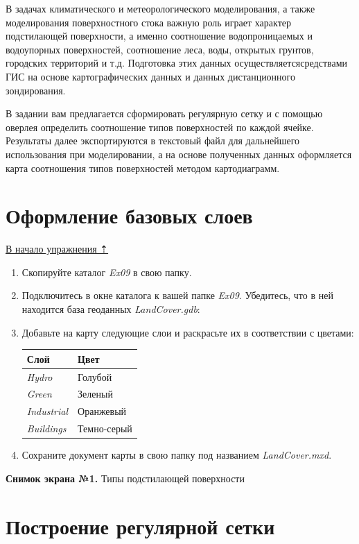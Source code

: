 \documentclass[]{book}
\theoremstyle{definition}
\theoremstyle{definition}
\theoremstyle{definition}
\theoremstyle{remark}
\begin{document}
В задачах климатического и метеорологического моделирования, а также
моделирования поверхностного стока важную роль играет характер
подстилающей поверхности, а именно соотношение водопроницаемых и
водоупорных поверхностей, соотношение леса, воды, открытых грунтов,
городских территорий и т.д. Подготовка этих данных
осуществляетсясредствами ГИС на основе картографических данных и данных
дистанционного зондирования.

В задании вам предлагается сформировать регулярную сетку и с помощью
оверлея определить соотношение типов поверхностей по каждой ячейке.
Результаты далее экспортируются в текстовый файл для дальнейшего
использования при моделировании, а на основе полученных данных
оформляется карта соотношения типов поверхностей методом картодиаграмм.

\hypertarget{land-cover-hydro-base}{%
\section{Оформление базовых слоев}\label{land-cover-hydro-base}}

\protect\hyperlink{land-cover-hydro}{В начало упражнения ⇡}

\begin{enumerate}
\def\labelenumi{\arabic{enumi}.}
\item
  Скопируйте каталог \emph{Ex09} в свою папку.
\item
  Подключитесь в окне каталога к вашей папке \emph{Ex09}. Убедитесь, что
  в ней находится база геоданных \emph{LandCover.gdb}:
\item
  Добавьте на карту следующие слои и раскрасьте их в соответствии с
  цветами:

  \begin{longtable}[]{@{}ll@{}}
  \toprule
  Слой & Цвет\tabularnewline
  \midrule
  \endhead
  \emph{Hydro} & Голубой\tabularnewline
  \emph{Green} & Зеленый\tabularnewline
  \emph{Industrial} & Оранжевый\tabularnewline
  \emph{Buildings} & Темно-серый\tabularnewline
  \bottomrule
  \end{longtable}
\item
  Сохраните документ карты в свою папку под названием
  \emph{LandCover.mxd}.
\end{enumerate}

\textbf{Снимок экрана №1.} Типы подстилающей поверхности

\hypertarget{land-cover-hydro-fishnet}{%
\section{Построение регулярной сетки}\label{land-cover-hydro-fishnet}}
\end{document}
